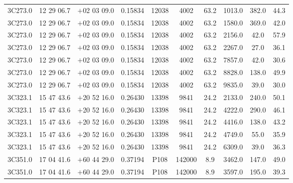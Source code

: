 \begin{landscape}
\begin{center}
\begin{longtable}{l c c c c c c c c c}
3C273.0  &                 12 29 06.7  &         $+$02 03 09.0  &       0.15834  & 12038  &   4002  &       63.2  &      1013.0  &  382.0  &  44.3  \\
3C273.0  &                 12 29 06.7  &         $+$02 03 09.0  &       0.15834  & 12038  &   4002  &       63.2  &      1580.0  &  369.0  &  42.0  \\
3C273.0  &                 12 29 06.7  &         $+$02 03 09.0  &       0.15834  & 12038  &   4002  &       63.2  &      2156.0  &  42.0  &   57.9  \\
3C273.0  &                 12 29 06.7  &         $+$02 03 09.0  &       0.15834  & 12038  &   4002  &       63.2  &      2267.0  &  27.0  &   36.1  \\
3C273.0  &                 12 29 06.7  &         $+$02 03 09.0  &       0.15834  & 12038  &   4002  &       63.2  &      7857.0  &  42.0  &   30.6  \\
3C273.0  &                 12 29 06.7  &         $+$02 03 09.0  &       0.15834  & 12038  &   4002  &       63.2  &      8828.0  &  138.0  &  49.9  \\
3C273.0  &                 12 29 06.7  &         $+$02 03 09.0  &       0.15834  & 12038  &   4002  &       63.2  &      9835.0  &  39.0  &   30.0  \\
3C323.1  &                 15 47 43.6  &         $+$20 52 16.0  &       0.26430  & 13398  &   9841  &       24.2  &      2133.0  &  240.0  &  50.1  \\
3C323.1  &                 15 47 43.6  &         $+$20 52 16.0  &       0.26430  & 13398  &   9841  &       24.2  &      4222.0  &  290.0  &  46.1  \\
3C323.1  &                 15 47 43.6  &         $+$20 52 16.0  &       0.26430  & 13398  &   9841  &       24.2  &      4416.0  &  138.0  &  43.2  \\
3C323.1  &                 15 47 43.6  &         $+$20 52 16.0  &       0.26430  & 13398  &   9841  &       24.2  &      4749.0  &  55.0  &   35.9  \\
3C323.1  &                 15 47 43.6  &         $+$20 52 16.0  &       0.26430  & 13398  &   9841  &       24.2  &      6309.0  &  39.0  &   36.3  \\
3C351.0  &                 17 04 41.6  &         $+$60 44 29.0  &       0.37194  & P108  &    142000  &     8.9  &       3462.0  &  147.0  &  49.0  \\
3C351.0  &                 17 04 41.6  &         $+$60 44 29.0  &       0.37194  & P108  &    142000  &     8.9  &       3597.0  &  195.0  &  39.3  \\

\end{longtable}
\end{center}
\end{landscape}
